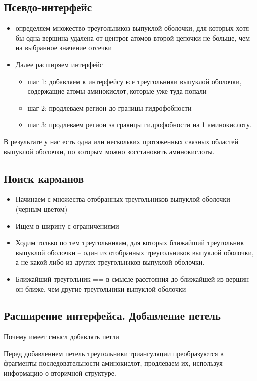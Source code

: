 \subsection{Псевдо-интерфейс}
\begin{itemize}
\item определяем множество треугольников выпуклой оболочки, для которых хотя бы одна вершина удалена от центров атомов второй цепочки не больше, чем на выбранное значение отсечки
\item Далее расширяем интерфейс
\begin{itemize}
\item шаг 1: добавляем к интерфейсу все треугольники выпуклой оболочки, содержащие атомы аминокислот, которые уже туда попали
\item шаг 2: продлеваем регион до границы гидрофобности
\item шаг 3: продлеваем регион за границы гидрофобности на 1 аминокислоту.
\end{itemize}
\end{itemize}


В результате у нас есть одна или нескольких протяженных связных областей выпуклой оболочки, по которым можно восстановить аминокислоты.
\subsection{Поиск карманов}
\begin{itemize}
\item Начинаем с множества отобранных треугольников выпуклой оболочки (черным цветом)
\item Ищем в ширину с ограничениями
\item Ходим только по тем треугольникам, для которых ближайший треугольник выпуклой оболочки -- один из отобранных треугольников выпуклой оболочки, а не какой-либо из других треугольников выпуклой оболочки.
\item Ближайший треугольник == в смысле расстояния до ближайшей из вершин он ближе, чем другие треугольники выпуклой оболочки
\end{itemize}
\subsection{Расширение интерфейса. Добавление петель}
Почему имеет смысл добавлять петли

Перед добавлением петель треугольники триангуляции преобразуются в фрагменты последовательности аминокислот, продлеваем их, используя информацию о вторичной структуре.



